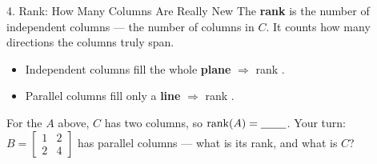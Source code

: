 \documentclass[10pt]{article}
\begin{document}
\begin{notesbox}{4. Rank: How Many Columns Are Really New}
The \textbf{rank} is the number of independent columns --- the number of columns in $C$. It counts
how many directions the columns truly span.
\begin{itemize}\setlength{\itemsep}{1pt}
  \item Independent columns fill the whole \textbf{plane} $\Rightarrow$ rank \blank{0.8cm}.
  \item Parallel columns fill only a \textbf{line} $\Rightarrow$ rank \blank{0.8cm}.
\end{itemize}
For the $A$ above, $C$ has two columns, so $\operatorname{rank}(A)=\blank{0.8cm}$.
Your turn: $B=\begin{bmatrix} 1 & 2 \\ 2 & 4 \end{bmatrix}$ has parallel columns --- what is its
rank, and what is $C$? \writeline
\end{notesbox}
\end{document}
